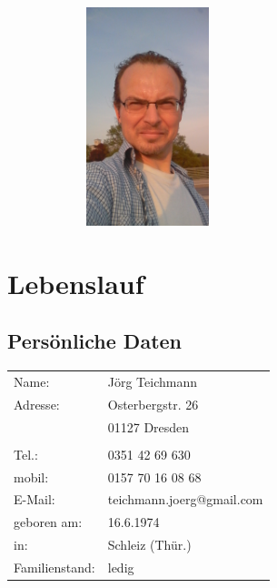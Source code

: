 \documentclass{article}
\begin{document}

\begin{figure}
    \includegraphics[width=1.5in, height=2.5in]{Image.jpeg}

\end{figure}

\section*{Lebenslauf}

\subsection*{Pers\"onliche Daten}
\begin{tabular}{lp{15cm}}
Name: 		& J\"org Teichmann\\
Adresse: 	& Osterbergstr. 26\\
	 		& 01127 Dresden\\
\\
Tel.:	 	& 0351 42 69 630 \\
mobil:      & 0157 70 16 08 68 \\
E-Mail:  	& teichmann.joerg@gmail.com \\
geboren am: & 16.6.1974\\
in:	    	& Schleiz (Th\"ur.)\\
Familienstand: 	& ledig
\end{tabular}
\end{document}
